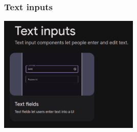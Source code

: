 \documentclass[12pt]{beamer}
\begin{document}
    \begin{frame}
        \frametitle{Text inputs}
    
        \begin{center}
            
            \includegraphics[width=0.5\textwidth]{text-inputs.png}

        \end{center}
    
    \end{frame}
\end{document}
